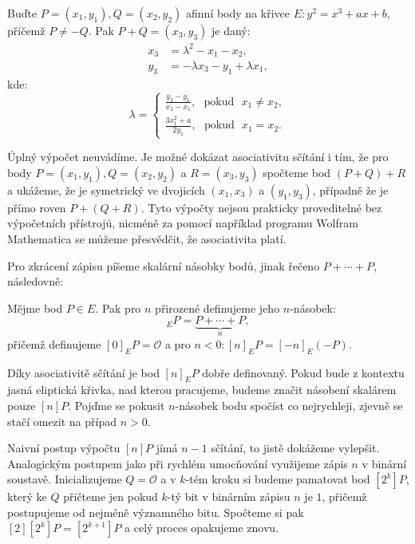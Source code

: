 \documentclass[12pt]{report}
\begin{document}
\begin{veta}\label{sum}
Buďte $P = (x_1,y_1), Q = (x_2,y_2)$ afinní body na křivce $E : y^2 = x^3+ax+b$, přičemž $P \neq -Q$. Pak $P+Q = (x_3,y_3)$ je daný:
\begin{align*}
x_3 &= \lambda^2 - x_1 - x_2,\\
y_3 &= - \lambda x_3 - y_1 + \lambda x_1,
\end{align*}
kde:
\begin{equation*}
\lambda = \begin{cases}
\frac{y_2 - y_1}{x_2-x_1}, \text{ } \mathrm{ pokud } \text{ } x_1 \neq x_2,\\
\frac{3x_1 ^2 + a}{2y_1}, \text{ } \mathrm{ pokud } \text{ }  x_1 = x_2.
\end{cases}
\end{equation*}

\end{veta}
Úplný výpočet neuvádíme. Je možné dokázat asociativitu sčítání i tím, že pro body $P = (x_1,y_1), Q = (x_2,y_2)$ a $R = (x_3,y_3)$ spočteme bod $(P+Q)+R$ a ukážeme, že je symetrický ve dvojicích $(x_1,x_3)$ a $(y_1,y_3)$, případně že je přímo roven $P+(Q+R)$. Tyto výpočty nejsou prakticky proveditelné bez výpočetních přístrojů, nicméně za pomocí například programu Wolfram Mathematica se můžeme přesvědčit, že asociativita platí.

Pro zkrácení zápisu píšeme skalární násobky bodů, jinak řečeno $P+\cdots+P$, následovně:

\begin{definice}
Mějme bod $P \in E$. Pak pro $n$ přirozené definujeme jeho $n$-násobek:
\begin{equation*}
[n]_E P = \underbrace{P+ \cdots + P}_{n},
\end{equation*}
přičemž definujeme $[0]_E P = \mathcal{O}$ a pro $n < 0: [n]_E P = [-n]_E (-P)$.
\end{definice}

Díky asociativitě sčítání je bod $[n]_EP$ dobře definovaný. Pokud bude z kontextu jasná eliptická křivka, nad kterou pracujeme, budeme značit násobení skalárem pouze $[n]P$. Pojďme se pokusit $n$-násobek bodu spočíst co nejrychleji, zjevně se stačí omezit na případ $n > 0$.

Naivní postup výpočtu $[n] P$ jímá $n-1$ sčítání, to jistě dokážeme vylepšit. Analogickým postupem jako při rychlém umocňování využijeme zápis $n$ v binární soustavě. Inicializujeme $Q = \mathcal{O}$ a v $k$-tém kroku si budeme pamatovat bod $[2^k] P$, který ke $Q$ přičteme jen pokud $k$-tý bit v binárním zápisu $n$ je $1$, přičemž postupujeme od nejméně významného bitu. Spočteme si pak $[2][2^k] P = [2^{k+1}] P$ a celý proces opakujeme znovu.
\end{document}
